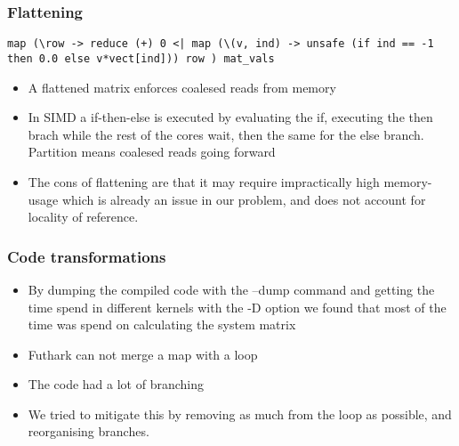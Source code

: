 \documentclass{beamer}
\begin{document}
\begin{frame}[fragile]
  \frametitle{Flattening}

  \begin{lstlisting}[frame=single, language=Futhark]
    map (\row -> reduce (+) 0 <| map (\(v, ind) -> unsafe (if ind == -1 then 0.0 else v*vect[ind])) row ) mat_vals
  \end{lstlisting}
  \begin{itemize}
    \item A flattened matrix enforces coalesed reads from memory
    \item In SIMD a if-then-else is executed by evaluating the if, executing the then brach while the rest of the cores wait, then the same for the else branch. Partition means coalesed reads going forward
    \item The cons of flattening are that it may require impractically high memory-usage which is already an issue in our problem, and does not account for locality of reference.
  \end{itemize}
\end{frame}
%

\begin{frame}
\frametitle{Code transformations}
\begin{itemize}
\item{By dumping the compiled code with the --dump command and getting the time spend in different kernels with the -D option we found that most of the time was spend on calculating the system matrix}
\item{Futhark can not merge a map with a loop}
\item{The code had a lot of branching}
\item{We tried to mitigate this by removing as much from the loop as possible, and reorganising branches.}
\end{itemize}
\end{frame}
\end{document}
